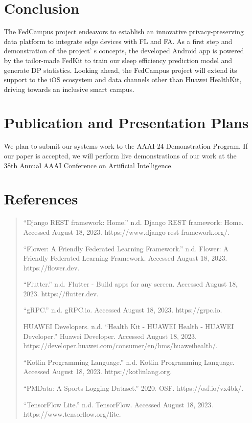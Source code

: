 \documentclass{article}
\begin{document}
\begin{multicols}{2}
\section{Conclusion}

The FedCampus project endeavors to establish an innovative
privacy-preserving data platform to integrate edge devices with FL and
FA. As a first step and demonstration of the project' s
concepts, the developed Android app is powered by the tailor-made FedKit
to train our sleep efficiency prediction model and generate DP
statistics. Looking ahead, the FedCampus project will extend its support
to the iOS ecosystem and data channels other than Huawei HealthKit,
driving towards an inclusive smart campus.

\section{Publication and Presentation Plans}

We plan to submit our systems work to the AAAI-24 Demonstration Program.
If our paper is accepted, we will perform live demonstrations of our
work at the 38th Annual AAAI Conference on Artificial Intelligence.
\end{multicols}

\section{References}
\begin{quote}

``Django REST framework: Home.'' n.d. Django REST framework: Home.
Accessed August 18, 2023. https://www.django-rest-framework.org/.

``Flower: A Friendly Federated Learning Framework.'' n.d. Flower: A
Friendly Federated Learning Framework. Accessed August 18, 2023.
https://flower.dev.

``Flutter.'' n.d. Flutter - Build apps for any screen. Accessed August
18, 2023. https://flutter.dev.

``gRPC.'' n.d. gRPC.io. Accessed August 18, 2023. https://grpc.io.

HUAWEI Developers. n.d. ``Health Kit - HUAWEI Health - HUAWEI
Developer.'' Huawei Developer. Accessed August 18, 2023.
https://developer.huawei.com/consumer/en/hms/huaweihealth/.

``Kotlin Programming Language.'' n.d. Kotlin Programming Language.
Accessed August 18, 2023. https://kotlinlang.org.

``PMData: A Sports Logging Dataset.'' 2020. OSF. https://osf.io/vx4bk/.

``TensorFlow Lite.'' n.d. TensorFlow. Accessed August 18, 2023.
https://www.tensorflow.org/lite.
\end{quote}
\end{document}
